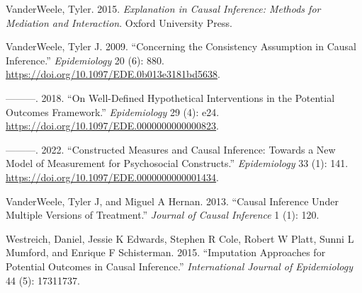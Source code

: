 \documentclass[
  singlecolumn]{report}
\newlength{\cslhangindent}
\newlength{\cslentryspacingunit} %
\newenvironment{CSLReferences}[2] %
 {%
  \setlength{\parindent}{0pt}
  \ifodd #1
  \let\oldpar\par
  \def\par{\hangindent=\cslhangindent\oldpar}
  \fi
  \setlength{\parskip}{#2\cslentryspacingunit}
 }%
 {}
\begin{document}
\begin{CSLReferences}{1}{0}
\leavevmode{}%
VanderWeele, Tyler. 2015. \emph{Explanation in Causal Inference: Methods
for Mediation and Interaction}. Oxford University Press.

\leavevmode{}%
VanderWeele, Tyler J. 2009. {``Concerning the Consistency Assumption in
Causal Inference.''} \emph{Epidemiology} 20 (6): 880.
\url{https://doi.org/10.1097/EDE.0b013e3181bd5638}.

\leavevmode{}%
---------. 2018. {``On Well-Defined Hypothetical Interventions in the
Potential Outcomes Framework.''} \emph{Epidemiology} 29 (4): e24.
\url{https://doi.org/10.1097/EDE.0000000000000823}.

\leavevmode{}%
---------. 2022. {``Constructed Measures and Causal Inference: Towards a
New Model of Measurement for Psychosocial Constructs.''}
\emph{Epidemiology} 33 (1): 141.
\url{https://doi.org/10.1097/EDE.0000000000001434}.

\leavevmode{}%
VanderWeele, Tyler J, and Miguel A Hernan. 2013. {``Causal Inference
Under Multiple Versions of Treatment.''} \emph{Journal of Causal
Inference} 1 (1): 120.

\leavevmode{}%
Westreich, Daniel, Jessie K Edwards, Stephen R Cole, Robert W Platt,
Sunni L Mumford, and Enrique F Schisterman. 2015. {``Imputation
Approaches for Potential Outcomes in Causal Inference.''}
\emph{International Journal of Epidemiology} 44 (5): 17311737.

\end{CSLReferences}
\end{document}
